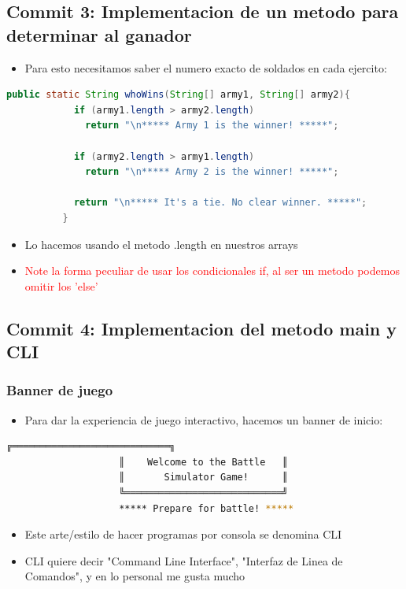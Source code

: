 \documentclass{article}
\begin{document}
        \subsection{Commit 3: Implementacion de un metodo para determinar al ganador}
        \begin{itemize}
            \item Para esto necesitamos saber el numero exacto de soldados en cada ejercito:
        \end{itemize}
        \begin{lstlisting}[language=java, caption={Metodo whoWins()}]
          public static String whoWins(String[] army1, String[] army2){
            if (army1.length > army2.length)
              return "\n***** Army 1 is the winner! *****";
        
            if (army2.length > army1.length)
              return "\n***** Army 2 is the winner! *****";
        
            return "\n***** It's a tie. No clear winner. *****";
          }
        \end{lstlisting}
        \begin{itemize}
            \item Lo hacemos usando el metodo .length en nuestros arrays 
            \item \textcolor{red}{Note la forma peculiar de usar los condicionales if, al ser un metodo podemos omitir los 'else'}
        \end{itemize}
        \subsection{Commit 4: Implementacion del metodo main y CLI}
        \subsubsection{Banner de juego}
        \begin{itemize}
            \item Para dar la experiencia de juego interactivo, hacemos un banner de inicio:
        \end{itemize}
        \begin{lstlisting}[language=bash, caption={Banner del juego}]
                    ╔════════════════════════════╗
                    ║    Welcome to the Battle   ║
                    ║       Simulator Game!      ║
                    ╚════════════════════════════╝
                    ***** Prepare for battle! *****

        \end{lstlisting}
        \begin{itemize}
            \item Este arte/estilo de hacer programas por consola se denomina CLI
            \item CLI quiere decir "Command Line Interface", "Interfaz de Linea de Comandos", y en lo personal me gusta mucho
        \end{itemize}
\end{document}
